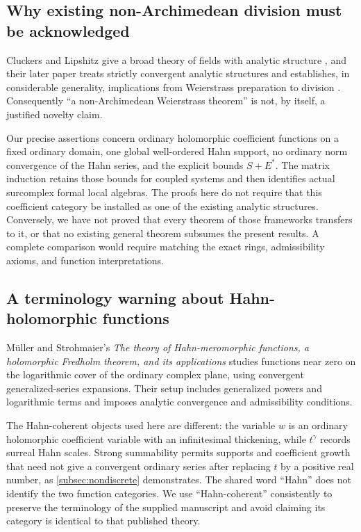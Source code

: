 \documentclass[11pt,oneside]{article}
\numberwithin{equation}{section}
\theoremstyle{definition}
\theoremstyle{remark}\newtheorem{remark}[theorem]{Remark}
\begin{document}
\subsection{Why existing non-Archimedean division must be acknowledged}
Cluckers and Lipshitz give a broad theory of fields with analytic structure \cite{CL}, and their later paper treats strictly convergent analytic structures and establishes, in considerable generality, implications from Weierstrass preparation to division \cite{CLstrict}. Consequently ``a non-Archimedean Weierstrass theorem'' is not, by itself, a justified novelty claim.

Our precise assertions concern ordinary holomorphic coefficient functions on a fixed ordinary domain, one global well-ordered Hahn support, no ordinary norm convergence of the Hahn series, and the explicit bounds \(S+E^*\). The matrix induction retains those bounds for coupled systems and then identifies actual surcomplex formal local algebras. The proofs here do not require that this coefficient category be installed as one of the existing analytic structures. Conversely, we have not proved that every theorem of those frameworks transfers to it, or that no existing general theorem subsumes the present results. A complete comparison would require matching the exact rings, admissibility axioms, and function interpretations.

\subsection{A terminology warning about Hahn-holomorphic functions}
M\"uller and Strohmaier's \emph{The theory of Hahn-meromorphic functions, a holomorphic Fredholm theorem, and its applications} \cite{MS} studies functions near zero on the logarithmic cover of the ordinary complex plane, using convergent generalized-series expansions. Their setup includes generalized powers and logarithmic terms and imposes analytic convergence and admissibility conditions.

The Hahn-coherent objects used here are different: the variable \(w\) is an ordinary holomorphic coefficient variable with an infinitesimal thickening, while \(t^\gamma\) records surreal Hahn scales. Strong summability permits supports and coefficient growth that need not give a convergent ordinary series after replacing \(t\) by a positive real number, as \cref{subsec:nondiscrete} demonstrates. The shared word ``Hahn'' does not identify the two function categories. We use ``Hahn-coherent'' consistently to preserve the terminology of the supplied manuscript and avoid claiming its category is identical to that published theory.
\end{document}
